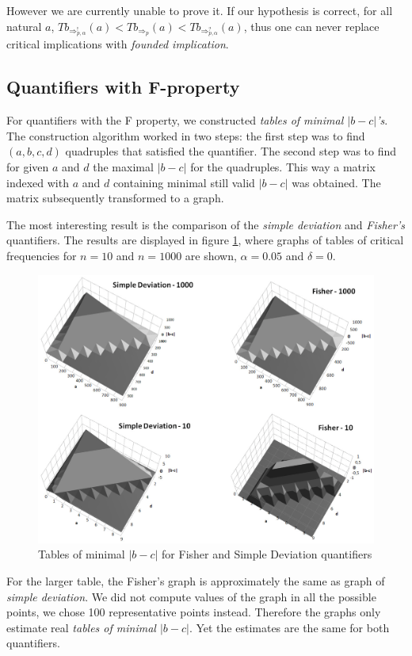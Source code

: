 However we are currently unable to prove it. If our hypothesis is correct, for all natural $a$, 
$Tb_{\Rightarrow^{!}_{p, \alpha}}(a) < Tb_{\Rightarrow_{p}}(a) < Tb_{\Rightarrow^{?}_{p, \alpha}}(a)$,
thus one can never replace critical implications with \emph{founded implication}.

\subsection{Quantifiers with F-property}
For quantifiers with the F property, we constructed \emph{tables of minimal $|b-c|$'s}. The construction algorithm worked in two steps: the first step was to find $(a,b,c,d)$ quadruples that satisfied the quantifier. The second step was to find for given $a$ and $d$ the maximal $|b-c|$ for the quadruples. This way a matrix indexed with $a$ and $d$ containing minimal still valid $|b-c|$ was obtained. The matrix subsequently transformed to a graph. 

The most interesting result is the comparison of the \emph{simple deviation} and \emph{Fisher's} quantifiers. The results are displayed in figure \ref{fig:FProperty}, where graphs of tables of critical frequencies for $n=10$ and $n=1000$ are shown, $\alpha=0.05$ and $\delta=0$.

\begin{figure}[ht]
\centering
\includegraphics[width=115mm]{SDFisher.eps}
\caption{Tables of minimal $|b-c|$ for Fisher and Simple Deviation quantifiers}
\label{fig:FProperty}
\end{figure}

For the larger table, the Fisher's graph is approximately the same as graph of \emph{simple deviation}. We did not compute values of the graph in all the possible points, we chose 100 representative points instead. Therefore the graphs only estimate real \emph{tables of minimal $|b-c|$}. Yet the estimates are the same for both quantifiers.


